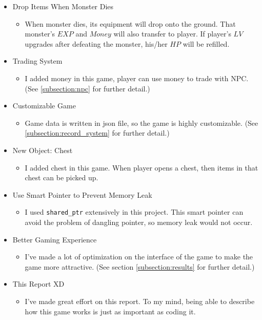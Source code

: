 \documentclass{article}
\begin{document}
\begin{itemize}
\begin{itemize}
        \end{itemize}
        \item Drop Items When Monster Dies
        \begin{itemize}
            \item When monster dies, its equipment will drop onto the ground. That monster's $EXP$ and $Money$ will also transfer to player. If player's $LV$ upgrades after defeating the monster, his/her $HP$ will be refilled.
        \end{itemize}
        \item Trading System
        \begin{itemize}
            \item I added money in this game, player can use money to trade with NPC. (See \ref{subsection:npc} for further detail.)
        \end{itemize}
        \item Customizable Game
        \begin{itemize}
            \item Game data is written in json file, so the game is highly customizable. (See \ref{subsection:record_system} for further detail.)
        \end{itemize}
        \item New Object: Chest
        \begin{itemize}
            \item I added chest in this game. When player opens a chest, then items in that chest can be picked up.
        \end{itemize}
        \item Use Smart Pointer to Prevent Memory Leak
        \begin{itemize}
            \item I used \texttt{shared\_ptr} extensively in this project. This smart pointer can avoid the problem of dangling pointer, so memory leak would not occur.
        \end{itemize}
        \item Better Gaming Experience
        \begin{itemize}
            \item I've made a lot of optimization on the interface of the game to make the game more attractive. (See section \ref{subsection:results} for further detail.)
        \end{itemize}
        \item This Report XD
        \begin{itemize}
            \item I've made great effort on this report. To my mind, being able to describe how this game works is just as important as coding it.
        \end{itemize}
    \end{itemize}
\end{document}
